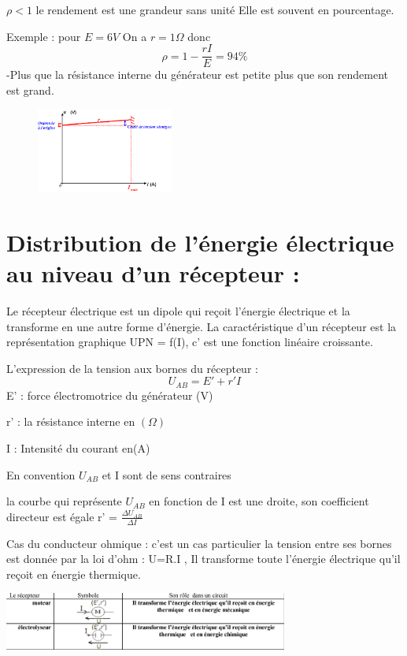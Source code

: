 \documentclass[12pt]{article}
\begin{document}
$\rho < 1 $ le rendement est une grandeur sans unité Elle est souvent en pourcentage.

Exemple : pour $E = 6V$ On a $r = 1\Omega$ donc $$\rho = 1 - \frac{rI}{E} = 94\%$$
-Plus que la résistance interne du générateur est petite plus que son rendement est grand.


\begin{figure}
  \vspace{-1cm}
    \includegraphics[width=0.4\textwidth]{./img/img_U_r.png}
\end{figure}

\section{Distribution de l’énergie électrique au niveau d’un récepteur :}
Le récepteur électrique est un dipole qui reçoit l’énergie électrique et la transforme en une autre forme d’énergie.
La caractéristique d’un récepteur est la représentation graphique UPN = f(I), c’ est une fonction linéaire croissante.

  L'expression de la tension aux bornes du récepteur : $$U_{AB} = E' + r'I$$ 
  E' : force électromotrice du générateur (V)

  r' : la résistance interne en $(\Omega)$

  I : Intensité du courant en(A)

En convention $U_{AB}$ et I sont de sens contraires

la courbe qui représente $U_{AB}$ en fonction de I est une droite, son coefficient directeur est égale r' = $\frac{\Delta{U_{AB}}}{\Delta{I}}$

Cas du conducteur ohmique : c’est un cas particulier la tension entre ses bornes est donnée par la loi d’ohm : U=R.I , Il transforme toute l'énergie électrique qu'il reçoit en énergie thermique.

\begin{center}
  \includegraphics[width=0.7\textwidth]{./img/Exemples _recepteur.png}
\end{center}
\end{document}

